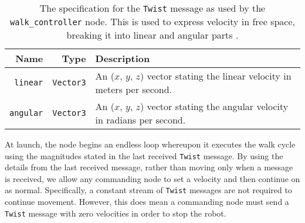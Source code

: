 \begin{table}[h!]
	\centering
	\begin{tabular}{ r r p{10cm} }
		\toprule
		\textbf{Name} & 
		\textbf{Type} & 
		\textbf{Description} \\
		\midrule

		\texttt{linear} & 
		\texttt{Vector3} &
		An ($x$, $y$, $z$) vector stating the linear velocity in meters per second. \\
		
		\hline

		\texttt{angular} & 
		\texttt{Vector3} & 
		An ($x$, $y$, $z$) vector stating the angular velocity in radians per second. \\
		\bottomrule
	\end{tabular}
	\caption{The specification for the \texttt{Twist} message as used by the \texttt{walk\_controller} node. This is used to express velocity in free space, breaking it into linear and angular parts \cite{ros_api_twist_msg}.}
	\label{tab:twist_msg}
\end{table}

At launch, the node begins an endless loop whereupon it executes the walk cycle using the magnitudes stated in the last received \texttt{Twist} message. By using the details from the last received message, rather than moving only when a message is received, we allow any commanding node to set a velocity and then continue on as normal. Specifically, a constant stream of \texttt{Twist} messages are not required to continue movement. However, this does mean a commanding node must send a \texttt{Twist} message with zero velocities in order to stop the robot. 


